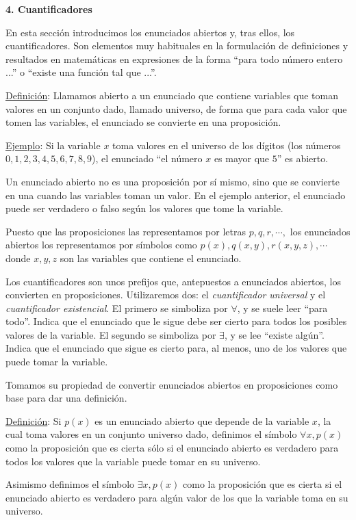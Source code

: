 \vspace{5mm}\textbf{4. Cuantificadores}

En esta sección introducimos los enunciados abiertos y, tras ellos, los cuantificadores. Son elementos muy habituales en la formulación de definiciones y resultados en matemáticas en expresiones de la forma “para todo número entero ...” o “existe una función tal que ...”.

\underline{Definición}: Llamamos abierto a un enunciado que contiene variables que toman valores en un conjunto dado, llamado universo, de forma que para cada valor que tomen las variables, el enunciado se convierte en una proposición.

\underline{Ejemplo}: Si la variable $x$ toma valores en el universo de los dígitos (los números $0,1,2,3,4,5,6,7,8,9$), el enunciado “el número $x$ es mayor que $5$” es abierto.

Un enunciado abierto no es una proposición por sí mismo, sino que se convierte en una cuando las variables toman un valor. En el ejemplo anterior, el enunciado puede ser verdadero o falso según los valores que tome la variable.

Puesto que las proposiciones las representamos por letras $p, q, r, \cdots,$ los enunciados abiertos los representamos por símbolos como $p(x), q(x, y), r(x, y, z), \cdots$ donde $x, y, z$ son las variables que contiene el enunciado.

Los cuantificadores son unos prefijos que, antepuestos a enunciados abiertos, los convierten en proposiciones. Utilizaremos dos: el \emph{cuantificador universal} y el \emph{cuantificador existencial}. El primero se simboliza por $\forall$, y se suele leer “para todo”. Indica que el enunciado que le sigue debe ser cierto para todos los posibles valores de la variable. El segundo se simboliza por $\exists$, y se lee “existe algún”. Indica que el enunciado que sigue es cierto para, al menos, uno de los valores que puede tomar la variable.

Tomamos su propiedad de convertir enunciados abiertos en proposiciones como base para dar una definición.

\underline{Definición}: Si $p(x)$ es un enunciado abierto que depende de la variable $x$, la cual toma valores en un conjunto universo dado, definimos el símbolo $\forall x, p(x)$ como la proposición que es cierta sólo si el enunciado abierto es verdadero para todos los valores que la variable puede tomar en su universo.

Asimismo definimos el símbolo $\exists x, p(x)$ como la proposición que es cierta si el enunciado abierto es verdadero para algún valor de los que la variable toma en su universo.

